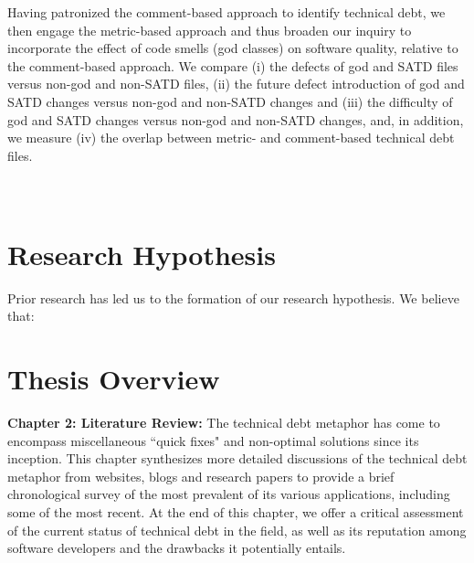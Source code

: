Having patronized the comment-based approach to identify technical debt, we then engage the metric-based approach and thus broaden our inquiry to incorporate the effect of code smells (god classes) on software quality, relative to the comment-based approach. We compare (i) the defects of god and SATD files versus non-god and non-SATD files, (ii) the future defect introduction of god and SATD changes versus non-god and non-SATD changes and (iii) the difficulty of god and SATD changes versus non-god and non-SATD changes, and, in addition, we measure (iv) the overlap between metric- and comment-based technical debt files.\\ \\ \\




\section{Research Hypothesis}
Prior research has led us to the formation of our research hypothesis. We believe that:


\section{Thesis Overview}

\textbf{Chapter 2: Literature Review:} The technical debt metaphor has come to encompass miscellaneous ``quick fixes" and non-optimal solutions since its inception.  This chapter synthesizes more detailed discussions of the technical debt metaphor from websites, blogs and research papers to provide a brief chronological survey of the most prevalent of its various applications, including some of the most recent.  At the end of this chapter, we offer a critical assessment of the current status of technical debt in the field, as well as its reputation among software developers and the drawbacks it potentially entails.


